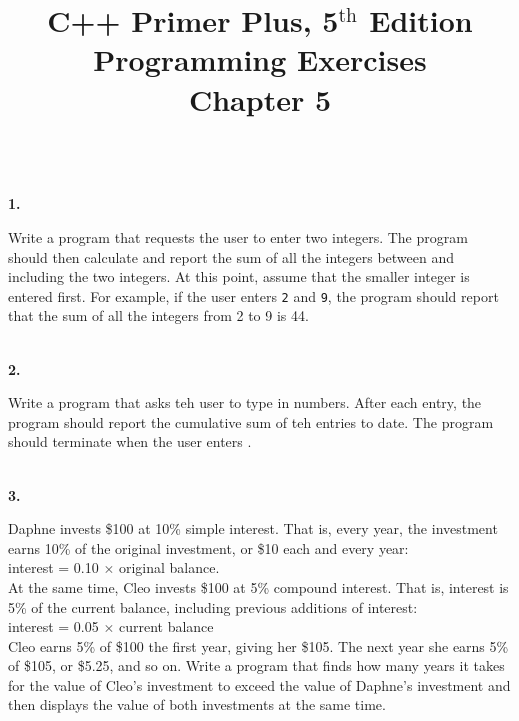 \documentclass[10 pt]{amsart}
\newlength{\cwidth}
\newenvironment{cpart}[2][\cwidth]
	{\\ \phantom{\qquad}\textbf{#2. }\begin{minipage}[t]{#1}}
	{\end{minipage}}
\newcommand{\ttt}[1]{\texttt{#1}}
\newcommand{\ttb}[1]{\pmb{\texttt{#1}}}
\newcommand{\ChapNum}{5}
\begin{document}
	\title
	[Chapter \ChapNum]
	{C++ Primer Plus, 5$^\text{th}$ Edition \\
	Programming Exercises \\
	Chapter \ChapNum}

	\maketitle

	\begin{cpart}{1}
		Write a program that requests the user to enter two integers.
		The program should then calculate and report the sum of all
		the integers between and including the two integers.
		At this point, assume that the smaller integer is entered first.
		For example, if the user enters \ttt{2} and \ttt{9},
		the program should report that the sum of all the integers
		from 2 to 9 is 44.
	\end{cpart}
	\vspace{2ex}

	\begin{cpart}{2}
		Write a program that asks teh user to type in numbers.
		After each entry, the program should report the cumulative sum
		of teh entries to date.
		The program should terminate when the user enters \ttb{0}.
	\end{cpart}
	\vspace{2ex}

	\begin{cpart}{3}
		Daphne invests \$100 at 10\% simple interest.
		That is, every year, the investment earns 10\% of the original
		investment, or \$10 each and every year: \vspace{2ex} \\
		interest = 0.10 $\times$ original balance. \vspace{2ex} \\
		At the same time, Cleo invests \$100 at 5\% compound interest.
		That is, interest is 5\% of the current balance, including
		previous additions of interest: \vspace{2ex} \\
		interest = 0.05 $\times$ current balance \vspace{2ex} \\
		Cleo earns 5\% of \$100 the first year, giving her \$105. 
		The next year she earns 5\% of \$105, or \$5.25, and so on.
		Write a program that finds how many years it takes for the value
		of Cleo's investment to exceed the value of Daphne's investment
		and then displays the value of both investments at the same 
		time.
	\end{cpart}
	\vspace{2ex}
\end{document}
